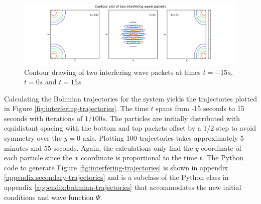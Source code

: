 \documentclass[10pt, reqno]{article}
\begin{document}
  \begin{figure}[!ht]
    \centerline{\includegraphics[scale=.5]{./imgs/contour-plot.png}}
    \caption{
      Contour drawing of two interfering wave packets at times $t=-15s$, $t=0s$ and $t=15s$.
    }
    \label{fig:interfering}
  \end{figure}

  Calculating the Bohmian trajectories for the system yields the trajectories plotted in Figure \ref{fig:interfering-trajectories}.
  The time $t$ spans from -15 seconds to 15 seconds with iterations of $1/100s$.
  The particles are initially distributed with equidistant spacing with the bottom and top packets offset by a 1/2 step to avoid symmetry over the $y=0$ axis.
  Plotting 100 trajectories takes approximately 5 minutes and 55 seconds.
  Again, the calculations only find the $y$ coordinate of each particle since the $x$ coordinate is proportional to the time $t$. 
  The Python code to generate Figure \ref{fig:interfering-trajectories} is shown in appendix \ref{appendix:secondary-trajectories} and is a 
    subclass of the Python class in appendix \ref{appendix:bohmian-trajectories} that accommodates the new initial conditions and wave function $\Psi$.
\end{document}

